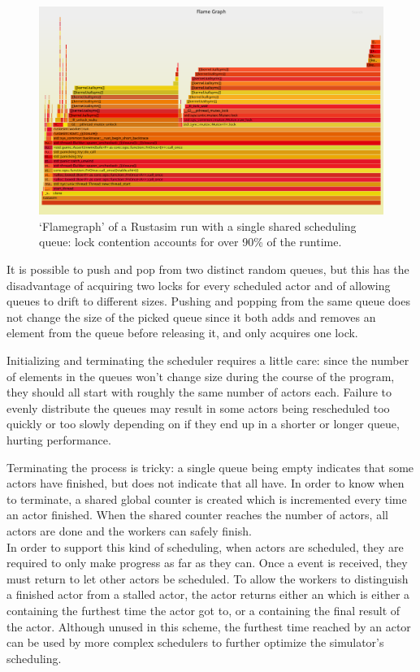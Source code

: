 \begin{figure}[h]
    \centering
    \includegraphics[width=\textwidth]{flame-lock-one-heap}
    \caption{`Flamegraph' of a Rustasim run with a single shared scheduling queue: lock contention accounts for over 90\% of the runtime.} %
    \label{rustasim-lock-one-heap:fig}
\end{figure}

It is possible to push and pop from two distinct random queues, but this has the disadvantage of acquiring two locks for every scheduled actor and of allowing queues to drift to different sizes.
Pushing and popping from the same queue does not change the size of the picked queue since it both adds and removes an element from the queue before releasing it, and only acquires one lock.

Initializing and terminating the scheduler requires a little care: since the number of elements in the queues won't change size during the course of the program, they should all start with roughly the same number of actors each.
Failure to evenly distribute the queues may result in some actors being rescheduled too quickly or too slowly depending on if they end up in a shorter or longer queue, hurting performance.

Terminating the process is tricky: a single queue being empty indicates that some actors have finished, but does not indicate that all have.
In order to know when to terminate, a shared global counter is created which is incremented every time an actor finished.
When the shared counter reaches the number of actors, all actors are done and the workers can safely finish.
\\

In order to support this kind of scheduling, when actors are scheduled, they are required to only make progress as far as they can.
Once a  event is received, they must return to let other actors be scheduled.
To allow the workers to distinguish a finished actor from a stalled actor, the actor returns either an  which is either a  containing the furthest time the actor got to, or a  containing the final result of the actor.
Although unused in this scheme, the furthest time reached by an actor can be used by more complex schedulers to further optimize the simulator's scheduling.

